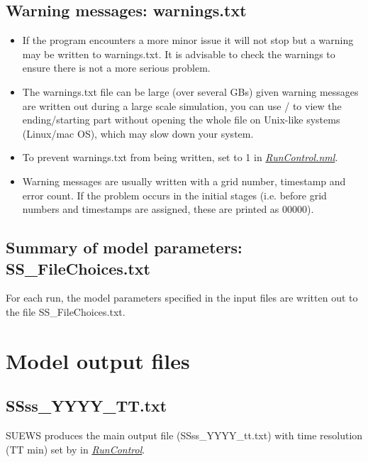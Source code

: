 \documentclass[letterpaper,10pt,english]{sphinxmanual}
\begin{document}
\subsection{Warning messages: warnings.txt}
\label{\detokenize{output-files:warning-messages-warnings-txt}}\begin{itemize}
\item {} 
If the program encounters a more minor issue it will not stop but a
warning may be written to warnings.txt. It is advisable to check the
warnings to ensure there is not a more serious problem.

\item {} 
The warnings.txt file can be large (over several GBs) given warning
messages are written out during a large scale simulation, you can use
/ to view the ending/starting part without opening
the whole file on Unix-like systems (Linux/mac OS), which may slow
down your system.

\item {} 
To prevent warnings.txt from being written, set 
to 1 in {\hyperref[\detokenize{output-files:RunControl.nml}]{\emph{RunControl.nml}}}.

\item {} 
Warning messages are usually written with a grid number, timestamp
and error count. If the problem occurs in the initial stages (i.e.
before grid numbers and timestamps are assigned, these are printed as
00000).

\end{itemize}


\subsection{Summary of model parameters: SS\_FileChoices.txt}
\label{\detokenize{output-files:summary-of-model-parameters-ss-filechoices-txt}}
For each run, the model parameters specified in the input files are
written out to the file SS\_FileChoices.txt.


\section{Model output files}
\label{\detokenize{output-files:model-output-files}}

\subsection{SSss\_YYYY\_TT.txt}
\label{\detokenize{output-files:ssss-yyyy-tt-txt}}
SUEWS produces the main output file (SSss\_YYYY\_tt.txt) with time
resolution (TT min) set by  in
{\hyperref[\detokenize{output-files:RunControl}]{\emph{RunControl}}}.
\end{document}
